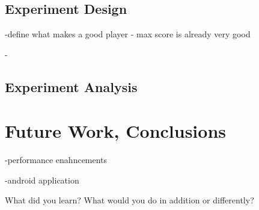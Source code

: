\documentclass[letterpaper]{article}
\begin{document}
\subsection{Experiment Design}
-define what makes a good player
- max score is already very good

-

\subsection{Experiment Analysis}

\section{Future Work, Conclusions}
-performance enahncements

-android application

What did you learn? What would you do in addition or differently?





\end{document}
